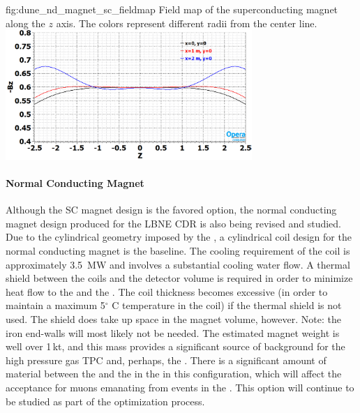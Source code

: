 \begin{dunefigure}{fig:dune_nd_magnet_sc_fieldmap}
{Field map of the superconducting magnet along the $z$ axis. The colors represent different radii from the center line.}
\includegraphics[width=0.70\textwidth]{graphics/dune_nd_magnet_sc_fieldmap.png} 
\end{dunefigure}
%
%
\paragraph{Normal Conducting Magnet}

Although the SC magnet design is the favored option, the normal conducting magnet design produced for the LBNE CDR is also being revised and studied.  Due to the cylindrical geometry imposed by the , a cylindrical coil design for the normal conducting magnet is the baseline. The cooling requirement of the coil is approximately \SI{3.5}{MW} and involves a substantial cooling water flow. A thermal shield between the coils and the detector volume is required in order to minimize heat flow to the  and the . The coil thickness becomes excessive (in order to maintain a maximum 5$^\circ$ C temperature in the coil) if the thermal shield is not used.  The shield does take up space in the magnet volume, however.  %
Note: the iron end-walls will most likely not be needed. The estimated magnet weight is well over 1\,kt, and this mass provides a significant source of background for the high pressure gas TPC and, perhaps, the  .  There is a significant amount of material between the  and the  in the  in this configuration, which will affect the acceptance for muons emanating from events in the  . This option will continue to be studied as part of the optimization process.

    
